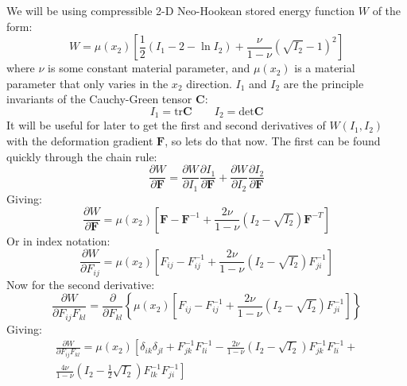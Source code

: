 \documentclass[11pt]{article}
\begin{document}
We will be using compressible 2-D Neo-Hookean stored energy function $W$ of the form:
\begin{equation} \label{eq:energyFunction}
W=\mu(x_2)\left[\frac{1}{2}(I_1 - 2- \ln{I_2}) + \frac{\nu}{1-\nu}(\sqrt{I_2} - 1)^2\right]
\end{equation}
where $\nu$ is some constant material parameter, and $\mu(x_2)$ is a material parameter that only varies in the $x_2$ direction. $I_1$ and $I_2$ are the principle invariants of the Cauchy-Green tensor $\mathbf{C}$:
\begin{equation} \label{eq:I_functions}
I_1 = \mathrm{tr} \mathbf{C} \qquad I_2 = \mathrm{det} \mathbf{C}
\end{equation}
It will be useful for later to get the first and second derivatives of $W(I_1,I_2)$ with the deformation gradient $\mathbf{F}$, so lets do that now. The first can be found quickly through the chain rule:
\begin{equation} \label{eq:dW_dF_chain}
\frac{\partial W}{\partial \mathbf{F}} = \frac{\partial W}{\partial I_1}\frac{\partial I_1}{\partial \mathbf{F}} + \frac{\partial W}{\partial I_2}\frac{\partial I_2}{\partial \mathbf{F}}
\end{equation}
Giving:
\begin{equation} \label{eq:dW_dF}
\frac{\partial W}{\partial \mathbf{F}} = \mu(x_2)\left[\mathbf{F} - \mathbf{F}^{-1} + \frac{2\nu}{1-\nu}(I_2 - \sqrt{I_2})\mathbf{F}^{-T}\right]
\end{equation}
Or in index notation:
\begin{equation} \label{eq:dW_dF_index}
\frac{\partial W}{\partial F_{ij}} = \mu(x_2)\left[F_{ij} - F^{-1}_{ij} + \frac{2\nu}{1-\nu}(I_2 - \sqrt{I_2})F^{-1}_{ji}\right]
\end{equation}
Now for the second derivative:
\begin{equation} \label{eq:d2W_dFF_pre}
\frac{\partial W}{\partial F_{ij}F_{kl}} = \frac{\partial}{\partial F_{kl}}\left\{\mu(x_2)\left[F_{ij} - F^{-1}_{ij} + \frac{2\nu}{1-\nu}(I_2 - \sqrt{I_2})F^{-1}_{ji}\right]\right\}
\end{equation}
Giving:
\begin{equation} \label{eq:d2W_dFF}
\begin{split}
\frac{\partial W}{\partial F_{ij}F_{kl}} = \mu(x_2)\left[\delta_{ik}\delta_{jl} + F^{-1}_{jk}F^{-1}_{li} -
\frac{2\nu}{1-\nu}(I_2 - \sqrt{I_2})F^{-1}_{jk}F^{-1}_{li} \right. + \\
 \left. \frac{4\nu}{1- \nu}(I_2 - \frac{1}{2}\sqrt{I_2})F^{-1}_{lk}F^{-1}_{ji}\right]
\end{split}
\end{equation} 
\end{document}
